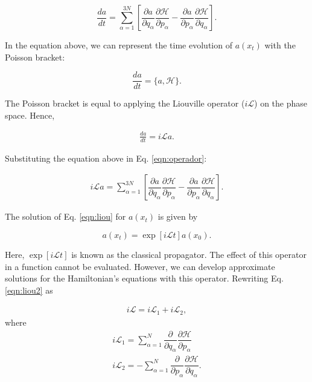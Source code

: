 \begin{equation}
\frac{da}{dt} = \sum_{\alpha=1}^{3N} \left [ \dfrac{\partial a}{\partial q_{\alpha}} \dfrac{\partial \mathcal{H}}{\partial p_{\alpha}}  - \dfrac{\partial a}{\partial p_{\alpha}} \dfrac{\partial \mathcal{H}}{\partial q_{\alpha}} \right].
\label{eqn:operador}
\end{equation}

In the equation above, we can represent the time evolution of $a(x_{t})$ with  the Poisson bracket:

\begin{equation}
\frac{da}{dt} = \{a,\mathcal{H}\}.
\end{equation}

The Poisson bracket is equal to applying the Liouville operator ($i\mathcal{L}$) on the phase space. Hence,

\begin{equation}
\begin{aligned}
\frac{da}{dt} = i\mathcal{L} a .
\end{aligned}
\label{eqn:liou}
\end{equation}

Substituting the equation above in Eq. \ref{eqn:operador}:

\begin{equation}
\begin{aligned}
i\mathcal{L} a = \sum_{\alpha=1}^{3N} \left [ \dfrac{\partial a}{\partial q_{\alpha}} \dfrac{\partial \mathcal{H}}{\partial p_{\alpha}}  - \dfrac{\partial a}{\partial p_{\alpha}} \dfrac{\partial \mathcal{H}}{\partial q_{\alpha}} \right].
\label{eqn:liou2}
\end{aligned}
\end{equation}

The solution of Eq. \ref{eqn:liou} for $a(x_{t})$ is given by

\begin{equation}
a(x_{t}) = \exp [i\mathcal{L}t] a(x_{0}).
\label{eqn:exactsol}
\end{equation}

Here, $\exp [i\mathcal{L}t]$ is known as the classical propagator. The effect of this operator in a function cannot be evaluated. However, we can develop approximate solutions for the Hamiltonian's equations with this operator. Rewriting Eq. \ref{eqn:liou2} as

\begin{equation}
\begin{aligned}
i\mathcal{L}  =  i\mathcal{L}_{1} + i\mathcal{L}_{2},
\end{aligned}
\end{equation}
where
\begin{equation}
\begin{aligned}
i\mathcal{L}_{1} = \sum_{\alpha=1}^{N}  \dfrac{\partial }{\partial q_{\alpha}} \dfrac{\partial \mathcal{H}}{\partial p_{\alpha}}   \\
i\mathcal{L}_{2} = - \sum_{\alpha=1}^{N} \dfrac{\partial }{\partial p_{\alpha}} \dfrac{\partial \mathcal{H}}{\partial q_{\alpha}} .
\end{aligned}
\end{equation}

